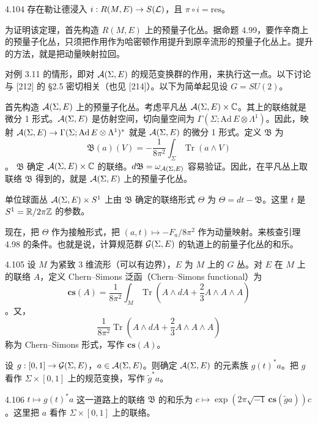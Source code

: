 \begin{theorem}{4.104}
  存在勒让德浸入 $i:R(M,E)\to S(\mathcal{L})$，且 $\pi\circ i=\mathrm{res}$。
\end{theorem}

为证明该定理，首先构造 $R(M,E)$ 上的预量子化丛。据命题 4.99，要作辛商上的预量子化丛，只须把作用作为哈密顿作用提升到原辛流形的预量子化丛上。提升的方法，就是把动量映射拉回。

对例 3.11 的情形，即对 $\mathcal{A}(\Sigma,E)$ 的规范变换群的作用，来执行这一点。以下讨论与 [212] 的 §2.5 密切相关（也见 [214]）。以下为简单起见设 $G=SU(2)$。

首先构造 $\mathcal{A}(\Sigma,E)$ 上的预量子化丛。考虑平凡丛 $\mathcal{A}(\Sigma,E)\times\mathbb{C}$。其上的联络就是微分 1 形式。$\mathcal{A}(\Sigma,E)$ 是仿射空间，切向量空间为 $\Gamma(\Sigma;\mathrm{Ad}\,E\otimes\Lambda^1)$。因此，映射 $\mathcal{A}(\Sigma,E)\to\Gamma(\Sigma;\mathrm{Ad}\,E\otimes\Lambda^1)^*$ 就是 $\mathcal{A}(\Sigma,E)$ 的微分 1 形式。定义 $\mathfrak{B}$ 为
\[
  \mathfrak{B}(a)(V)=-\frac{1}{8\pi^2}\int_\Sigma\operatorname{Tr}(a\wedge V)
\]。
$\mathfrak{B}$ 确定 $\mathcal{A}(\Sigma,E)\times\mathbb{C}$ 的联络。$d\mathfrak{B}=\omega_{\mathcal{A}(\Sigma,E)}$ 容易验证。因此，在平凡丛上取联络 $\mathfrak{B}$ 得到的，就是 $\mathcal{A}(\Sigma,E)$ 上的预量子化丛。

单位球面丛 $\mathcal{A}(\Sigma,E)\times S^1$ 上由 $\mathfrak{B}$ 确定的联络形式 $\Theta$ 为 $\Theta=dt-\mathfrak{B}$。这里 $t$ 是 $S^1=\mathbb{R}/2\pi\mathbb{Z}$ 的参数。

现在，把 $\Theta$ 作为接触形式，把 $(a,t)\mapsto-F_a/8\pi^2$ 作为动量映射。来核查引理 4.98 的条件。也就是说，计算规范群 $\mathcal{G}(\Sigma,E)$ 的轨道上的前量子化丛的和乐。

\begin{definition}{4.105}
  设 $M$ 为紧致 3 维流形（可以有边界），$E$ 为 $M$ 上的 $G$ 丛。对 $E$ 在 $M$ 上的联络 $A$，定义 Chern–Simons 泛函（Chern–Simons functional）为
  \[
    \mathbf{cs}(A)=\frac{1}{8\pi^2}\int_M\operatorname{Tr}\left(A\wedge dA+\frac{2}{3}A\wedge A\wedge A\right)
  \]。又，
  \[
    \frac{1}{8\pi^2}\operatorname{Tr}\left(A\wedge dA+\frac{2}{3}A\wedge A\wedge A\right)
  \]
  称为 Chern–Simons 形式，写作 $\mathbf{cs}(A)$。
\end{definition}

设 $g:[0,1]\to\mathcal{G}(\Sigma,E)$，$a\in\mathcal{A}(\Sigma,E)$。则确定 $\mathcal{A}(\Sigma,E)$ 的元素族 $g(t)^*a$。把 $g$ 看作 $\Sigma\times[0,1]$ 上的规范变换，写作 $\tilde g^*a$。

\begin{lemma*}{4.106}
  $t\mapsto g(t)^*a$ 这一道路上的联络 $\mathfrak{B}$ 的和乐为 $c\mapsto\exp(2\pi\sqrt{-1}\,\mathbf{cs}(\tilde ga))c$。这里把 $a$ 看作 $\Sigma\times[0,1]$ 上的联络。
\end{lemma*}

